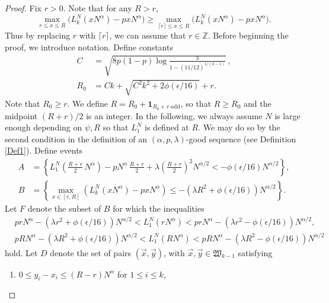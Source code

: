 	\begin{proof}
		
		Fix $r>0$. Note that for any $R>r$,
		\[
		\max_{r\leq x\leq R} \big(L_k^N(xN^\alpha) - pxN^\alpha\big) \geq \max_{\lceil r\rceil \leq x \leq R} \big(L_k^N(xN^\alpha) - pxN^\alpha\big).
		\]
		Thus by replacing $r$ with $\lceil r\rceil$, we can assume that $r\in\mathbb{Z}$. Before beginning the proof, we introduce notation. Define constants
		\begin{align}
		C &= \sqrt{ 8p(1-p) \log\frac{3}{1-(11/12)^{1/(k-1)}}}\,,\label{21Cdef}\\
		R_0 &= Ck+\sqrt{C^{2}k^{2}+2\phi(\epsilon/16)}+r. \label{21Rdef}
		\end{align}
		Note that $R_0\geq r$. We define $R = R_0 + \mathbf{1}_{R_0 + r\;\mathrm{odd}}$, so that $R\geq R_0$ and the midpoint $(R+r)/2$ is an integer. In the following, we always assume $N$ is large enough depending on $\psi,R$ so that $L_1^N$ is defined at $R$. We may do so by the second condition in the definition of an $(\alpha,p,\lambda)$-good sequence (see Definition \ref{Def1}). Define events
		\begin{align*}
		A &= \left\{L_1^N\left(\frac{R+r}{2}\,N^\alpha\right) - pN^\alpha\,\frac{R+r}{2} + \lambda\left(\frac{R+r}{2}\right)^2 N^{\alpha/2} < -\phi(\epsilon/16)N^{\alpha/2}\right\},\\
		B &= \left\{\max_{x\in[r,R]} \left(L_k^N(xN^\alpha) - pxN^\alpha\right) \leq -(\lambda R^2 + \phi(\epsilon/16)) N^{\alpha/2} \right\}.
		\end{align*}
		Let $F$ denote the subset of $B$ for which the inequalities
		\begin{equation}\label{21x1y1}
		\begin{split}
		& prN^\alpha - (\lambda r^2+\phi(\epsilon/16))N^{\alpha/2} < L_1^N(rN^\alpha) <  prN^\alpha - (\lambda r^2-\phi(\epsilon/16))N^{\alpha/2},\\
		& pRN^\alpha - (\lambda R^2+\phi(\epsilon/16))N^{\alpha/2} < L_1^N(RN^\alpha) <  pRN^\alpha - (\lambda R^2-\phi(\epsilon/16))N^{\alpha/2}
		\end{split}
		\end{equation}
		hold. Let $D$ denote the set of pairs $(\vec{x},\vec{y})$, with $\vec{x},\vec{y}\in\mathfrak{W}_{k-1}$ satisfying 
		\begin{enumerate}[label=(\arabic*)]
			
			\item $0\leq y_i - x_i \leq (R-r)N^\alpha$ for $1\leq i\leq k$,
			

\end{enumerate}
\end{proof}

